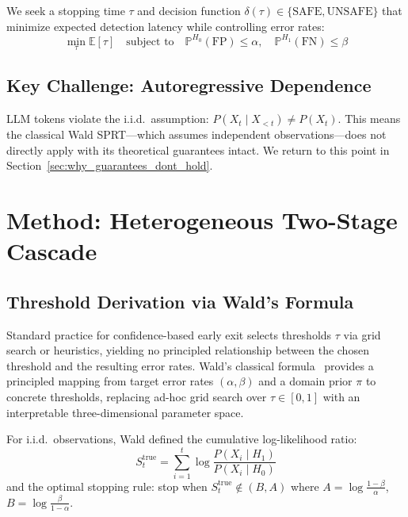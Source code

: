 \documentclass[acmtjournal, acmnowidth]{acmart}
\newcommand{\Hzero}{H_0}
\newcommand{\Hone}{H_1}
\newcommand{\E}{\mathbb{E}}
\newcommand{\Prob}{\mathbb{P}}
\theoremstyle{definition}
\begin{document}
We seek a stopping time $\tau$ and decision function $\delta(\tau) \in \{\text{SAFE}, \text{UNSAFE}\}$ that minimize expected detection latency while controlling error rates:
\begin{equation}
\min_\tau \E[\tau] \quad \text{subject to} \quad \Prob^{\Hzero}(\text{FP}) \leq \alpha, \quad \Prob^{\Hone}(\text{FN}) \leq \beta
\label{eq:optimal_stopping}
\end{equation}

\subsection{Key Challenge: Autoregressive Dependence}

LLM tokens violate the i.i.d.\ assumption: $P(X_t \mid X_{<t}) \neq P(X_t)$.
This means the classical Wald SPRT---which assumes independent observations---does not directly apply with its theoretical guarantees intact. We return to this point in Section~\ref{sec:why_guarantees_dont_hold}.

\section{Method: Heterogeneous Two-Stage Cascade}

\subsection{Threshold Derivation via Wald's Formula}

Standard practice for confidence-based early exit selects thresholds $\tau$ via grid search or heuristics, yielding no principled relationship between the chosen threshold and the resulting error rates. Wald's classical formula~\cite{wald1945} provides a principled mapping from target error rates $(\alpha, \beta)$ and a domain prior $\pi$ to concrete thresholds, replacing ad-hoc grid search over $\tau \in [0,1]$ with an interpretable three-dimensional parameter space.

For i.i.d.\ observations, Wald defined the cumulative log-likelihood ratio:
\begin{equation}
S_t^{\text{true}} = \sum_{i=1}^{t} \log \frac{P(X_i \mid \Hone)}{P(X_i \mid \Hzero)}
\label{eq:classical_sprt}
\end{equation}
and the optimal stopping rule: stop when $S_t^{\text{true}} \notin (B, A)$ where $A = \log\frac{1-\beta}{\alpha}$, $B = \log\frac{\beta}{1-\alpha}$.
\end{document}
